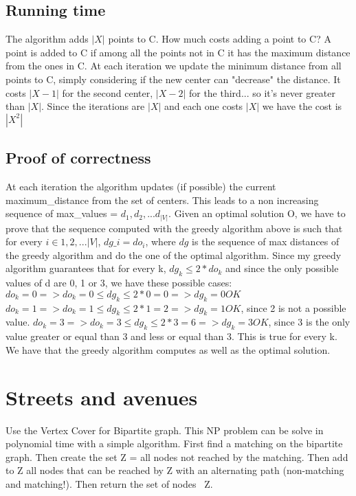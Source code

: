 \documentclass[12pt]{article}
\begin{document}
\subsection*{Running time}
The algorithm adds $|X|$ points to C. How much costs adding a point to C? A point is added to C if among all the points not in C it has the maximum distance from the ones in C. At each iteration we update the minimum distance from all points to C, simply considering if the new center can "decrease" the distance. It costs $|X - 1|$ for the second center, $|X - 2|$ for the third... so it's never greater than $|X|$. Since the iterations are $|X|$ and each one costs $|X|$ we have the cost is $|X^2|$
\subsection*{Proof of correctness}
At each iteration the algorithm updates (if possible) the current maximum\_distance from the set of centers. This leads to a non increasing sequence of max\_values = ${d_1, d_2, ... d_{|V|}}$. Given an optimal solution O, we have to prove that the sequence computed with the greedy algorithm above is such that for every $i \in {1, 2, ... |V|}$, $dg\_i = do_i $, where $dg$ is the sequence of max distances of the greedy algorithm and do the one of the optimal algorithm. Since my greedy algorithm guarantees that for every k, $dg_k \leq 2* do_k$ and since the only possible values of d are 0, 1 or 3, we have these possible cases:
$do_k = 0 =>  do_k = 0 \leq dg_k \leq 2* 0 = 0 => dg_k = 0 OK$
$do_k = 1 =>  do_k = 1 \leq dg_k \leq 2* 1 = 2 => dg_k = 1 OK$, since 2 is not a possible value.
$do_k = 3 =>  do_k = 3 \leq dg_k \leq 2* 3 = 6 => dg_k = 3 OK$, since 3 is the only value greater or equal than 3 and less or equal than 3.
This is true for every k. We have that the greedy algorithm computes as well as the optimal solution.

\section{Streets and avenues}
Use the Vertex Cover for Bipartite graph. This NP problem can be solve in polynomial time with a simple algorithm. First find a matching on the bipartite graph. Then create the set Z = all nodes not reached by the matching. Then add to Z all nodes that can be reached by Z with an alternating path (non-matching and matching!). Then return the set of nodes \ Z.
\section{}
\end{document}
